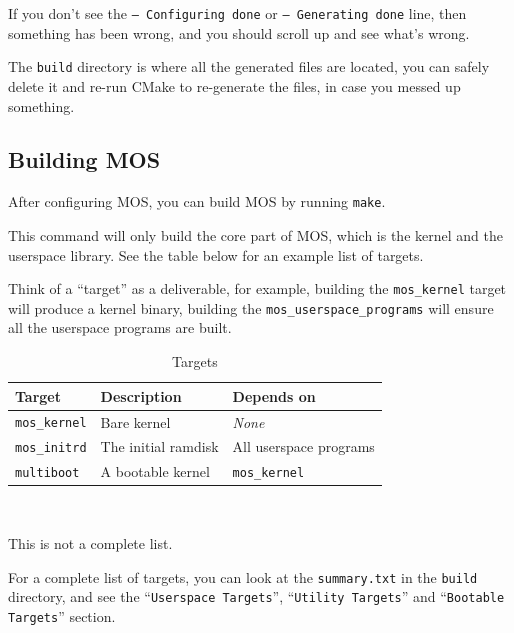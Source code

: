 If you don't see the \texttt{-- Configuring done} or \texttt{-- Generating done} line, then
something has been wrong, and you should scroll up and see what's wrong.

The \texttt{build} directory is where all the generated files are located, you can safely
delete it and re-run CMake to re-generate the files, in case you messed up something.

\subsection{Building MOS}

After configuring MOS, you can build MOS by running \texttt{make}.

This command will only build the core part of MOS, which is the kernel and the userspace library.
See the table below for an example list of targets.

\begin{tip}
    \item Think of a ``target'' as a deliverable, for example, building the \texttt{mos\_kernel} target
    will produce a kernel binary, building the \texttt{mos\_userspace\_programs} will ensure
    all the userspace programs are built.
\end{tip}

\begin{table}[ht]
    \centering
    \small
    \begin{tabular}{|l|l|l|}
        \hline
        \textbf{Target}      & \textbf{Description} & \textbf{Depends on}    \\ \hline
        \texttt{mos\_kernel} & Bare kernel          & \textit{None}          \\ \hline
        \texttt{mos\_initrd} & The initial ramdisk  & All userspace programs \\ \hline
        \texttt{multiboot}   & A bootable kernel    & \texttt{mos\_kernel}   \\ \hline
    \end{tabular} \\
    \begin{note}
        \item This is not a complete list.
        \item For a complete list of targets, you can look at the \texttt{summary.txt} in the \texttt{build} directory,
        and see the ``\texttt{Userspace Targets}'', ``\texttt{Utility Targets}'' and ``\texttt{Bootable Targets}'' section.
    \end{note}
    \caption{Targets}
    \label{tab:targets}
\end{table}

